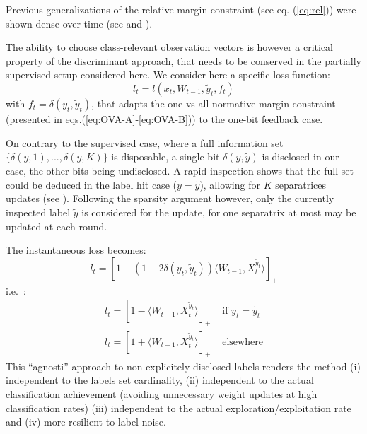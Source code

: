 \documentclass[preprint,12pt,authoryear]{elsarticle}
\begin{document}
{\color{green} Previous generalizations of the relative margin constraint (see eq. (\ref{eq:rel})) were shown dense over time (see \cite{kakade2008efficient} and \cite{zhong2015esann}).} 

The ability to choose class-relevant observation vectors is however a critical property of the discriminant approach, that needs to be conserved in the partially supervised setup considered here. 
We consider here a specific loss function:
$$l_t = l(x_t,W_{t-1},\tilde{y}_t,f_t)$$
with $f_t = \delta(y_t,\tilde{y}_t)$,
that adapts the one-vs-all normative margin constraint (presented in eqs.(\ref{eq:OVA-A}-\ref{eq:OVA-B})) to the one-bit feedback case. 

On contrary to the supervised case, where a full information set $\{\delta(y,1), ..., \delta(y,K)\}$ is disposable, a single bit $\delta(y,\tilde{y})$ is disclosed in our case, the other bits being undisclosed. 
A rapid inspection shows that the full set could be deduced in the label hit case ($y = \tilde{y}$), allowing for $K$ separatrices updates (see \cite{chen2009beyond}). Following the sparsity argument however,
only the  currently inspected label $\tilde{y}$ is  considered  for the update, for one separatrix at most may be updated at each round. 

The instantaneous loss becomes:
\begin{equation}\label{eq:loss}
l_t = [1 + (1 - 2 \delta(y_t,\tilde{y}_t)) \langle W_{t-1}, X_t^{\tilde{y}_t}\rangle]_+
\end{equation}
i.e.~:
\begin{align}
	l_t = [1 - \langle W_{t-1}, X_t^{\tilde{y}_t}\rangle]_+ &\text{ if }y_t=\tilde{y}_t\label{eq:loss-A}\\
	l_t = [1 + \langle W_{t-1}, X_t^{\tilde{y}_t}\rangle]_+ &\text{ elsewhere} \label{eq:loss-B}
\end{align}
{\color{blue} This ``agnosti'' approach to non-explicitely disclosed labels %
renders the method (i) independent to the labels set cardinality, (ii) independent to the actual classification achievement (avoiding unnecessary weight updates at high classification rates) (iii) independent to the actual exploration/exploitation rate and (iv) more resilient to label noise.}
\end{document}
